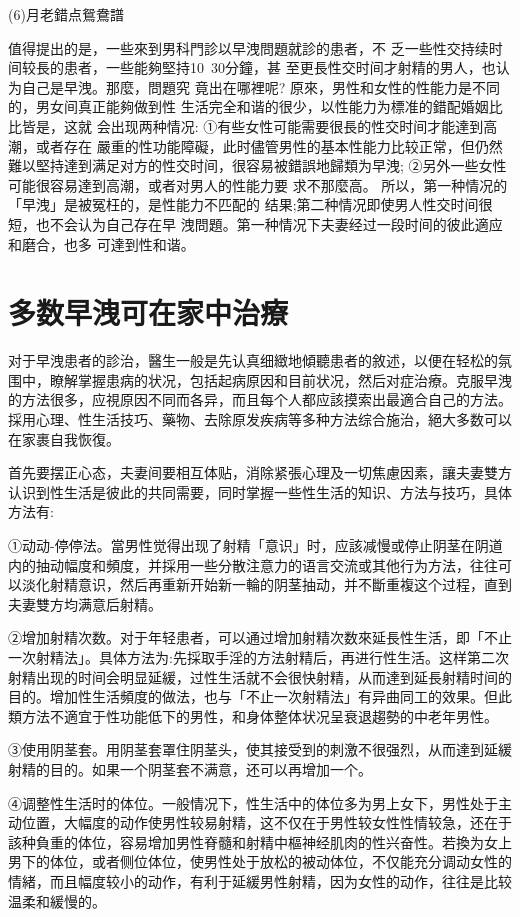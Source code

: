 \documentclass[12pt,UTF8]{ctexbook}
\begin{document}
(6)月老錯点鴛鴦譜

值得提出的是，一些來到男科門診以早洩問題就診的患者，不
乏一些性交持续时间较長的患者，一些能夠堅持10~30分鐘，甚
至更長性交时间才射精的男人，也认为自己是早洩。那麼，問題究
竟出在哪裡呢?
原來，男性和女性的性能力是不同的，男女间真正能夠做到性
生活完全和谐的很少，以性能力为標准的錯配婚姻比比皆是，这就
会出现两种情况:
①有些女性可能需要很長的性交时间才能達到高潮，或者存在
嚴重的性功能障礙，此时儘管男性的基本性能力比较正常，但仍然
難以堅持達到满足对方的性交时间，很容易被錯誤地歸類为早洩;
②另外一些女性可能很容易達到高潮，或者对男人的性能力要
求不那麼高。
所以，第一种情况的「早洩」是被冤枉的，是性能力不匹配的
结果;第二种情况即使男人性交时间很短，也不会认为自己存在早
洩問題。第一种情况下夫妻经过一段时间的彼此適应和磨合，也多
可達到性和谐。

\section{多数早洩可在家中治療}

对于早洩患者的診治，醫生一般是先认真细緻地傾聽患者的敘述，以便在轻松的氛围中，瞭解掌握患病的状况，包括起病原因和目前状况，然后对症治療。克服早洩的方法很多，应視原因不同而各异，而且每个人都应該摸索出最適合自己的方法。採用心理、性生活技巧、藥物、去除原发疾病等多种方法综合施治，絕大多数可以在家裹自我恢復。

首先要摆正心态，夫妻间要相互体贴，消除紧張心理及一切焦慮因素，讓夫妻雙方认识到性生活是彼此的共同需要，同时掌握一些性生活的知识、方法与技巧，具体方法有:

①动动-停停法。當男性觉得出现了射精「意识」时，应該减慢或停止阴茎在阴道内的抽动幅度和頻度，并採用一些分散注意力的语言交流或其他行为方法，往往可以淡化射精意识，然后再重新开始新一輪的阴茎抽动，并不斷重複这个过程，直到夫妻雙方均满意后射精。

②增加射精次数。对于年轻患者，可以通过增加射精次数來延長性生活，即「不止一次射精法」。具体方法为:先採取手淫的方法射精后，再进行性生活。这样第二次射精出现的时间会明显延緩，过性生活就不会很快射精，从而達到延長射精时间的目的。增加性生活頻度的做法，也与「不止一次射精法」有异曲同工的效果。但此類方法不適宜于性功能低下的男性，和身体整体状况呈衰退趨勢的中老年男性。

③使用阴茎套。用阴茎套罩住阴茎头，使其接受到的刺激不很强烈，从而達到延緩射精的目的。如果一个阴茎套不满意，还可以再增加一个。

④调整性生活时的体位。一般情况下，性生活中的体位多为男上女下，男性处于主动位置，大幅度的动作使男性较易射精，这不仅在于男性较女性性情较急，还在于該种負重的体位，容易增加男性脊髓和射精中樞神经肌肉的性兴奋性。若換为女上男下的体位，或者侧位体位，使男性处于放松的被动体位，不仅能充分调动女性的情緒，而且幅度较小的动作，有利于延緩男性射精，因为女性的动作，往往是比较温柔和緩慢的。
\end{document}
